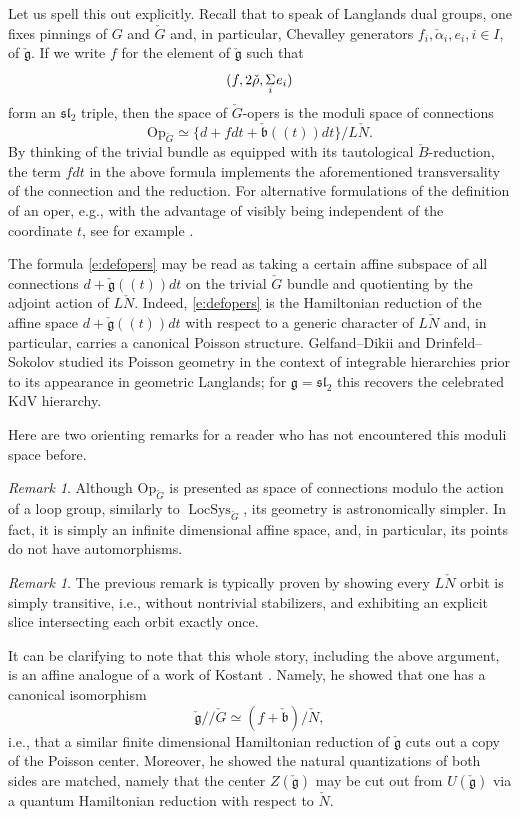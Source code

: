 \documentclass[10pt]{amsart}
\newcommand{\cB}{\check{B}}
\newcommand{\cN}{\check{N}}
\newcommand{\Op}{\mathrm{Op}_{\cG}}
\newcommand{\LS}{\on{LocSys}_{\cG}}
\newcommand{\fg}{\mathfrak{g}}
\newcommand{\on}{\operatorname}
\theoremstyle{remark}
\newtheorem{re}[subsubsection]{Remark}
\newcommand{\fsl}{\mathfrak{sl}}
\newcommand{\fb}{\mathfrak{b}}
\numberwithin{equation}{section}
\newcommand{\cfg}{\check{\fg}}
\newcommand{\cG}{\check{G}}
\begin{document}
Let us spell this out explicitly. Recall 
that to speak of Langlands dual groups, one fixes pinnings of $G$ and $\cG$ 
and, in particular, Chevalley generators $f_i, \check{\alpha}_i, e_i, i \in I$, 
of 
$\check{\fg}$. If we write $f$ for the element of $\cfg$ such that 
%
\[
  (f, 2 \check{\rho}, \underset i \Sigma \hspace{.2mm} e_i )
\]
%
form an $\fsl_2$ triple, then the space of $\cG$-opers is the moduli space of 
connections 
%
\begin{equation} \label{e:defopers}
   \Op \simeq \{ d  + f dt + \check{\fb}(\!(t)\!)dt \} / L\check{N}.
\end{equation}
%
 By thinking of the trivial bundle as equipped with its 
tautological $\cB$-reduction, the term $f dt$ in the above formula implements 
the aforementioned transversality of the connection and the reduction. For 
alternative formulations of the definition of an oper, e.g., with the advantage of visibly being independent of the coordinate $t$, see for example 
\cite{BD}.




The formula \eqref{e:defopers} may be read as taking a certain affine subspace of all connections 
$d + \cfg(\!(t)\!)dt$ on the trivial $\cG$ bundle and quotienting by the 
adjoint 
action of $L\check{N}$.
Indeed, \eqref{e:defopers} is the Hamiltonian reduction of the affine space $d 
+ \cfg(\!(t)\!)dt$ with respect 
to a generic character of $L\check{N}$ and, in particular, 
carries a canonical Poisson structure. Gelfand--Dikii and Drinfeld--Sokolov \cite{drinfeldsokolov} studied its Poisson geometry in the context of integrable hierarchies 
prior to its appearance in 
geometric Langlands; for $\fg = \fsl_2$ this recovers the celebrated KdV hierarchy.


Here are two orienting remarks for a reader who has not encountered this moduli 
space before. 

\begin{re} Although $\Op$ is presented as space of connections modulo the 
action of a loop group, similarly to $\LS$, its geometry is astronomically 
simpler. In fact, it is simply an infinite dimensional affine space, and, in 
particular, its points do not have automorphisms.  
\end{re}


\begin{re}  The previous remark is typically proven by showing every $L\check{N}$ 
orbit is simply transitive, i.e., without nontrivial stabilizers, and exhibiting 
an explicit slice intersecting each orbit exactly once. 

It can be clarifying to note that this whole story, including the above argument, is an affine analogue of a 
work of Kostant \cite{kostantslice}. Namely, he showed that one has a canonical isomorphism 
%
\[
   \cfg /\!/ \cG \simeq (f + \check{\fb}) / \check{N},
\]
%
i.e., that a similar finite dimensional Hamiltonian reduction of $\cfg$ cuts out 
a copy of the Poisson center. Moreover, he showed the natural quantizations of 
both sides are matched, namely that the center $Z(\cfg)$ may be cut out from  
$U(\cfg)$ via a quantum Hamiltonian reduction with respect to $\cN$. 
	\end{re}
\end{document}
